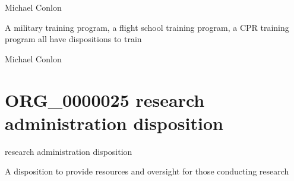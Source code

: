 \documentclass[letterpaper,10pt,english]{sphinxmanual}
\begin{document}
\begin{sphinxShadowBox}

\sphinxAtStartPar
Michael Conlon 
\end{sphinxShadowBox}

\begin{sphinxShadowBox}

\sphinxAtStartPar
A military training program, a flight school training program, a CPR training program all have dispositions to train
\end{sphinxShadowBox}

\begin{sphinxShadowBox}

\sphinxAtStartPar
Michael Conlon 
\end{sphinxShadowBox}
\begin{quote}
\label{\detokenize{doc-ORG_0000025:org-0000025}}\label{\detokenize{doc-ORG_0000025:research-administration-disposition}}\label{\detokenize{doc-ORG_0000025:org-0000025}}
\ignorespaces \end{quote}


\section{ORG\_0000025 \sphinxhyphen{} research administration disposition}
\label{\detokenize{doc-ORG_0000025:org-0000025-research-administration-disposition}}\label{\detokenize{doc-ORG_0000025:index-0}}\label{\detokenize{doc-ORG_0000025::doc}}
\begin{sphinxShadowBox}

\sphinxAtStartPar
research administration disposition
\end{sphinxShadowBox}

\begin{sphinxShadowBox}

\sphinxAtStartPar
A disposition to provide resources and oversight for those conducting research
\end{sphinxShadowBox}
\end{document}

